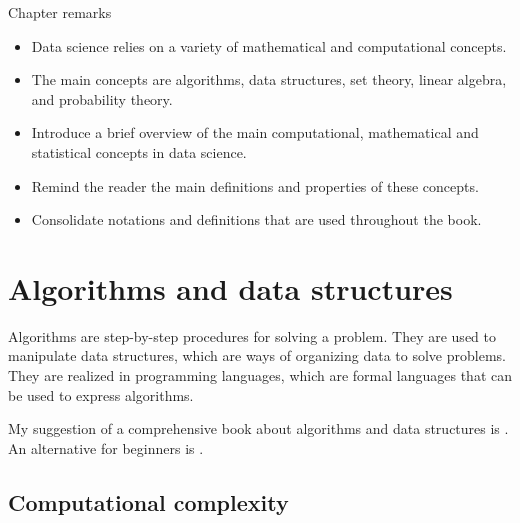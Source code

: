 \begin{mainbox}{Chapter remarks}


  \startcontents[chapters]
  \vspace{1em}


  \begin{itemize}
    \itemsep0em
    \item Data science relies on a variety of mathematical and computational concepts.
    \item The main concepts are algorithms, data structures, set theory, linear algebra,
      and probability theory.
  \end{itemize}


  \begin{itemize}
    \itemsep0em
    \item Introduce a brief overview of the main computational, mathematical and
      statistical concepts in data science.
    \item Remind the reader the main definitions and properties of these concepts.
    \item Consolidate notations and definitions that are used throughout the book.
  \end{itemize}
\end{mainbox}

{}
\clearpage

\section{Algorithms and data structures}

Algorithms are step-by-step procedures for solving a problem.  They are used to
manipulate data structures, which are ways of organizing data to solve problems.
They are realized in programming languages, which are formal languages that can be used
to express algorithms.

My suggestion of a comprehensive book about algorithms and data structures is
\textcite{Cormen2022}.  An alternative for beginners is
\textcite{Guttag2021}.

\subsection{Computational complexity}

